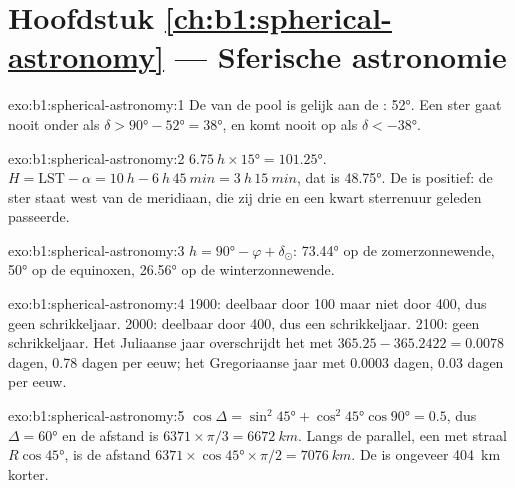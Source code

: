 \section*{Hoofdstuk \ref{ch:b1:spherical-astronomy} --- Sferische astronomie}

\begin{solution}{exo:b1:spherical-astronomy:1}
De  van de pool is gelijk aan de : \ang{52}. Een ster gaat
nooit onder als $\delta > \ang{90} - \ang{52} = \ang{38}$, en komt nooit op als
$\delta < \ang{-38}$.
\end{solution}

\begin{solution}{exo:b1:spherical-astronomy:2}
$\qty{6.75}{h}\times\ang{15} = \ang{101.25}$. $H = \mathrm{LST} - \alpha =
\qty{10}{h} - \qty{6}{h}\,\qty{45}{min} = \qty{3}{h}\,\qty{15}{min}$, dat is
\ang{48.75}. De  is positief: de ster staat west van de meridiaan, die
zij drie en een kwart sterrenuur geleden passeerde.
\end{solution}

\begin{solution}{exo:b1:spherical-astronomy:3}
$h = \ang{90} - \varphi + \delta_\odot$: \ang{73.44} op de zomerzonnewende,
\ang{50} op de equinoxen, \ang{26.56} op de winterzonnewende.
\end{solution}

\begin{solution}{exo:b1:spherical-astronomy:4}
1900: deelbaar door 100 maar niet door 400, dus geen schrikkeljaar. 2000:
deelbaar door 400, dus een schrikkeljaar. 2100: geen schrikkeljaar. Het
Juliaanse jaar overschrijdt het  met $365.25 - 365.2422 = 0.0078$
dagen, \num{0.78} dagen per eeuw; het Gregoriaanse jaar met $0.0003$ dagen,
\num{0.03} dagen per eeuw.
\end{solution}

\begin{solution}{exo:b1:spherical-astronomy:5}
$\cos\Delta = \sin^2\ang{45} + \cos^2\ang{45}\cos\ang{90} = 0.5$, dus
$\Delta = \ang{60}$ en de afstand is $6371\times\pi/3 = \qty{6672}{km}$. Langs de
parallel, een  met straal $R\cos\ang{45}$, is de afstand
$6371\times\cos\ang{45}\times\pi/2 = \qty{7076}{km}$. De  is ongeveer
\qty{404}{km} korter.
\end{solution}

